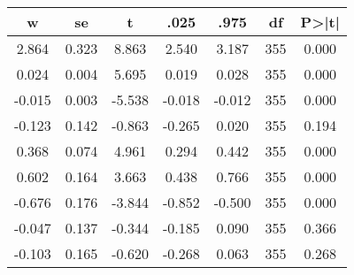 \begin{tabular}{ccccccc}
\hline \hline
     w &    se &      t &   .025 &   .975 &  df &  P>|t| \\
\hline \hline
 2.864 & 0.323 &  8.863 &  2.540 &  3.187 & 355 &  0.000 \\
 0.024 & 0.004 &  5.695 &  0.019 &  0.028 & 355 &  0.000 \\
-0.015 & 0.003 & -5.538 & -0.018 & -0.012 & 355 &  0.000 \\
-0.123 & 0.142 & -0.863 & -0.265 &  0.020 & 355 &  0.194 \\
 0.368 & 0.074 &  4.961 &  0.294 &  0.442 & 355 &  0.000 \\
 0.602 & 0.164 &  3.663 &  0.438 &  0.766 & 355 &  0.000 \\
-0.676 & 0.176 & -3.844 & -0.852 & -0.500 & 355 &  0.000 \\
-0.047 & 0.137 & -0.344 & -0.185 &  0.090 & 355 &  0.366 \\
-0.103 & 0.165 & -0.620 & -0.268 &  0.063 & 355 &  0.268 \\
\hline \hline
\end{tabular}
